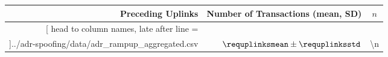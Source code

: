 \documentclass{standalone}
\begin{document}
\begin{tabular}{rrr}
	\toprule
	Preceding Uplinks & Number of Transactions (mean, SD) & \multicolumn{1}{c}{$n$} \\
	\midrule
	\csvreader[
	head to column names,
	late after line = \\
	]{../adr-spoofing/data/adr_rampup_aggregated.csv}{}{
		\num{\inituplinks} & $\requplinksmean \pm \requplinksstd $ & \num{\n}
	}
	\bottomrule
\end{tabular}
\end{document}
